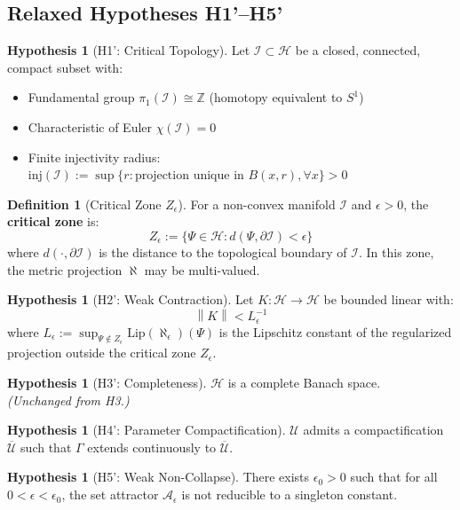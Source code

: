 \documentclass[11pt,a4paper]{article}
\theoremstyle{plain}
\theoremstyle{definition}
\newtheorem{definition}[theorem]{Definition}
\newtheorem{hypothesis}[theorem]{Hypothesis}
\newcommand{\Hilb}{\mathcal{H}}
\newcommand{\I}{\mathcal{I}}
\newcommand{\U}{\mathcal{U}}
\newcommand{\norm}[1]{\left\lVert #1 \right\rVert}
\begin{document}
\subsection{Relaxed Hypotheses H1'--H5'}

\begin{hypothesis}[H1': Critical Topology]\label{hyp:H1p}
Let $\I \subset \Hilb$ be a closed, connected, compact subset with:
\begin{itemize}
    \item Fundamental group $\pi_1(\I) \cong \mathbb{Z}$ (homotopy equivalent to $S^1$)
    \item Characteristic of Euler $\chi(\I) = 0$
    \item Finite injectivity radius: $\text{inj}(\I) := \sup\{r : \text{projection unique in } B(x,r), \forall x\} > 0$
\end{itemize}
\end{hypothesis}

\begin{definition}[Critical Zone $Z_\epsilon$]\label{def:criticalzone}
For a non-convex manifold $\I$ and $\epsilon > 0$, the \textbf{critical zone} is:
\[
Z_\epsilon := \{\Psi \in \Hilb : d(\Psi, \partial \I) < \epsilon\}
\]
where $d(\cdot, \partial \I)$ is the distance to the topological boundary of $\I$. In this zone, the metric projection $\aleph$ may be multi-valued.
\end{definition}

\begin{hypothesis}[H2': Weak Contraction]\label{hyp:H2p}
Let $K: \Hilb \to \Hilb$ be bounded linear with:
\[
\norm{K} < L_\epsilon^{-1}
\]
where $L_\epsilon := \sup_{\Psi \notin Z_\epsilon} \text{Lip}(\aleph_\epsilon)(\Psi)$ is the Lipschitz constant of the regularized projection outside the critical zone $Z_\epsilon$.
\end{hypothesis}

\begin{hypothesis}[H3': Completeness]\label{hyp:H3p}
$\Hilb$ is a complete Banach space. \\
\textit{(Unchanged from H3.)}
\end{hypothesis}

\begin{hypothesis}[H4': Parameter Compactification]\label{hyp:H4p}
$\U$ admits a compactification $\overline{\U}$ such that $\Gamma$ extends continuously to $\overline{\U}$.
\end{hypothesis}

\begin{hypothesis}[H5': Weak Non-Collapse]\label{hyp:H5p}
There exists $\epsilon_0 > 0$ such that for all $0 < \epsilon < \epsilon_0$, the set attractor $\mathcal{A}_\epsilon$ is not reducible to a singleton constant.
\end{hypothesis}
\end{document}
